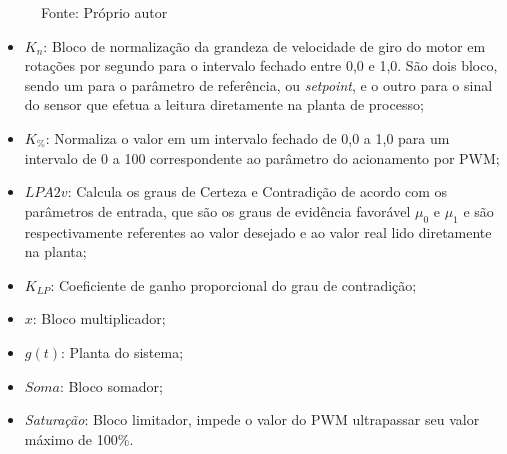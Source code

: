 \begin{figure}[!htb]
\label{fig:diagramaBlocosLPA2v}


{\small Fonte: Próprio autor}
\end{figure}


\begin{itemize}
  \item $K_n$: Bloco de normalização da grandeza de velocidade de giro do motor em rotações por segundo para o intervalo fechado entre 0,0 e 1,0. 
São dois bloco, sendo um para o parâmetro de referência, 
ou \emph{setpoint}, e o outro para o sinal do sensor que efetua a 
leitura diretamente na planta de processo;

  \item $K_{\%}$: Normaliza o valor em um intervalo fechado de 0,0 a 1,0 para um intervalo de 0 a 100 correspondente ao parâmetro do acionamento por PWM;

  \item $LPA2v$: Calcula os graus de Certeza e Contradição 
de acordo com os parâmetros de entrada, 
que são os graus de evidência favorável $\mu _0$ e $\mu _1$ e são
respectivamente referentes ao valor desejado e 
ao valor real lido diretamente na planta;

  \item $K_{LP}$: Coeficiente de ganho proporcional do grau de contradição;

  \item $x$: Bloco multiplicador;

  \item $g(t)$: Planta do sistema;

  \item $Soma$: Bloco somador;

  \item \emph{Saturação}: Bloco limitador, impede o valor do PWM ultrapassar seu valor máximo de 100\%. 
\end{itemize}






